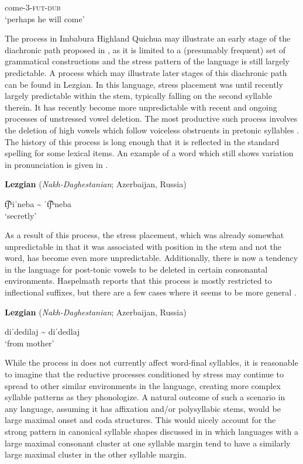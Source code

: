 come-3-\textsc{fut-dub}\\
\glt ‘perhaps he will come’
\citep[209]{Cole1982}
\z

  The process in Imbabura Highland Quichua may illustrate an early stage of the diachronic path proposed in \citet{BybeeEtAl1998}, as it is limited to a (presumably frequent) set of grammatical constructions and the stress pattern of the language is still largely predictable. A process which may illustrate later stages of this diachronic path can be found in Lezgian. In this language, stress placement was until recently largely predictable within the stem, typically falling on the second syllable therein. It has recently become more unpredictable with recent and ongoing processes of unstressed vowel deletion. The most productive such process involves the deletion of high vowels which follow voiceless obstruents in pretonic syllables \citep[36]{Haspelmath1993}. The history of this process is long enough that it is reflected in the standard spelling for some lexical items. An example of a word which still shows variation in pronunciation is given in .

\ea\label{ex:5.2}
  \textbf{Lezgian} (\textit{Nakh-Daghestanian}; Azerbaijan, Russia)

t͡ʃʰiˈneba {\textasciitilde} ˈt͡ʃʰneba\\
\glt ‘secretly’
\citep[38]{Haspelmath1993}
\z

As a result of this process, the stress placement, which was already somewhat unpredictable in that it was associated with position in the stem and not the word, has become even more unpredictable. Additionally, there is now a tendency in the language for post-tonic vowels to be deleted in certain consonantal environments. Haspelmath reports that this process is mostly restricted to inflectional suffixes, but there are a few cases where it seems to be more general .

\ea\label{ex:5.3}
  \textbf{Lezgian} (\textit{Nakh-Daghestanian}; Azerbaijan, Russia)

diˈdedilaj {\textasciitilde} diˈdedlaj\\
\glt ‘from mother’
\citep[40]{Haspelmath1993}
\z

  While the process in  does not currently affect word-final syllables, it is reasonable to imagine that the reductive processes conditioned by stress may continue to spread to other similar environments in the language, creating more complex syllable patterns as they phonologize. A natural outcome of such a scenario in any language, assuming it has affixation and/or polysyllabic stems, would be large maximal onset and coda structures. This would nicely account for the strong pattern in canonical syllable shapes discussed in  in which languages with a large maximal consonant cluster at one syllable margin tend to have a similarly large maximal cluster in the other syllable margin.

